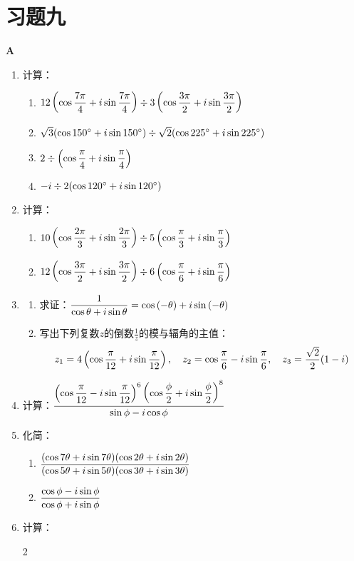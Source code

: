 \section*{习题九}
\begin{center}
\bfseries A
\end{center}
\begin{enumerate}
    \item 计算：
    \begin{enumerate}[(1)]
        \item $12\left(\cos\dfrac{7\pi}{4}+i\sin\dfrac{7\pi}{4}\right)\div 3\left(\cos\dfrac{3\pi}{2}+i\sin\dfrac{3\pi}{2}\right)$
        \item $\sqrt{3}(\cos150^{\circ}+i\sin150^{\circ})\div \sqrt{2}(\cos225^{\circ}+i\sin225^{\circ})$
        \item $2\div \left(\cos\dfrac{\pi}{4}+i\sin\dfrac{\pi}{4}\right)$
        \item $-i\div 2(\cos120^{\circ}+i\sin120^{\circ})$
    \end{enumerate}
    \item 计算：
    \begin{enumerate}[(1)]
        \item $10\left(\cos\dfrac{2\pi}{3}+i\sin\dfrac{2\pi}{3}\right)\div 5\left(\cos\dfrac{\pi}{3}+i\sin\dfrac{\pi}{3}\right)$
        \item $12\left(\cos\dfrac{3\pi}{2}+i\sin\dfrac{3\pi}{2}\right)\div 6\left(\cos\dfrac{\pi}{6}+i\sin\dfrac{\pi}{6}\right)$
    \end{enumerate}
    \item \begin{enumerate}[(1)]
        \item 求证：$\dfrac{1}{\cos\theta+i\sin\theta}=\cos\left(-\theta\right)+i\sin\left(-\theta\right)$
        \item 写出下列复数$z$的倒数$\frac{1}{z}$的模与辐角的主值：
\[z_1=4\left(\cos\dfrac{\pi}{12}+i\sin\dfrac{\pi}{12}\right),\quad z_2=\cos\dfrac{\pi}{6}-i\sin\dfrac{\pi}{6},\quad z_3=\dfrac{\sqrt{2}}{2}(1-i)\]
    \end{enumerate}
    \item 计算：$\dfrac{\left(\cos\dfrac{\pi}{12}-i\sin\dfrac{\pi}{12}\right)^6\left(\cos\dfrac{\phi}{2}+i\sin\dfrac{\phi}{2}\right)^8}{\sin\phi-i\cos\phi}$
    \item 化简： \begin{enumerate}[(1)]
        \item $\dfrac{(\cos7\theta+i\sin7\theta)(\cos2\theta+i\sin2\theta)}{(\cos5\theta+i\sin5\theta)(\cos3\theta+i\sin3\theta)}$
        \item $\dfrac{\cos\phi-i\sin\phi}{\cos\phi+i\sin\phi}$
    \end{enumerate}
    \item 计算：
\begin{multicols}{2}
    \begin{enumerate}[(1)]

\end{enumerate}
\end{multicols}
\end{enumerate}
